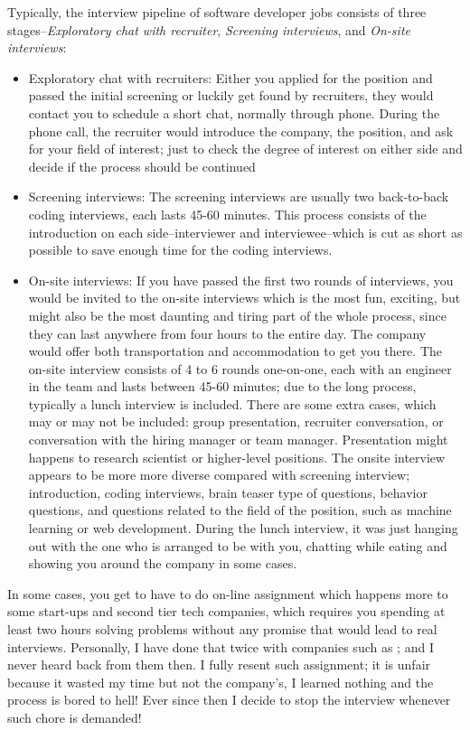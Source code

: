 \documentclass[../main.tex]{subfiles}
\begin{document}
Typically, the interview pipeline of software developer jobs consists of three stages--\textit{Exploratory chat with recruiter}, \textit{Screening interviews}, and \textit{On-site interviews}:
\begin{itemize}
    \item Exploratory chat with recruiters: Either you applied for the position and passed the initial screening or luckily get found by recruiters, they would contact you to schedule a short chat, normally through phone. During the phone call, the recruiter would introduce the company, the position, and ask for your field of interest; just to check the degree of interest on either side and decide if the process should be continued 
    \item Screening interviews: The screening interviews are usually two back-to-back coding interviews, each lasts 45-60 minutes. This process consists of the introduction on each side--interviewer and interviewee--which is cut as short as possible to save enough time for the coding interviews. 
    \item On-site interviews: If you have passed the first two rounds of interviews, you would be invited to the on-site interviews which is the most fun, exciting, but might also be the most daunting and tiring part of the whole process, since they can last anywhere from four hours to the entire day. The company would offer both transportation and accommodation to get you there. The on-site interview consists of 4 to 6 rounds one-on-one, each with an engineer in the team and lasts between 45-60 minutes; due to the long process, typically a lunch interview is included. There are some extra cases, which may or may not be included: group presentation, recruiter conversation, or conversation with the hiring manager or team manager. Presentation might happens to research scientist or higher-level positions. The onsite interview appears to be more more diverse compared with screening interview; introduction, coding interviews, brain teaser type of questions, behavior questions, and questions related to the field of the position, such as machine learning or web development. During the lunch interview, it was just hanging out with the one who is arranged to be with you, chatting while eating and showing you around the company in some cases. 
\end{itemize}
In some cases, you get to have to do on-line assignment which happens more to some start-ups and second tier tech companies, which requires you spending at least two hours solving problems without any promise that would lead to real interviews. Personally, I have done that twice with companies such as ; and I never heard back from them then. I fully resent such assignment; it is unfair because it wasted my time but not the company's, I learned nothing and the process is bored to hell! Ever since then I decide to stop the interview whenever such chore is demanded! 
\end{document}

